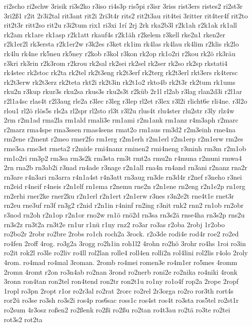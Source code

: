 {ri2scho
ri2schw
3risik
ri3s2ko
r3iso
ri4s3p
ris5pi
r3isr
3riss
rist3ers
ristes2
ri2st3r
3ri2ß1
r2it
2r3i2tal
rit3ant
rit2i
2ri3t4r
rits2
rit2t3au
rit4tei
3ritter
rit4ter4f
rit2to
rit2t3r
ritt2so
rit2u
r3i2tum
rix1
ri3xi
1rí
2rj
2rk
rka2b3l
r2k1ah
r2k1ak
rk1all
rk2am
rk1are
rk1asp
r2k1att
rkauf4s
r2k1äh
r2kelem
r3kell
rke2n1
rken2er
r2k1er2l
rk3ersta
r2k1er2w
r3k2es
r3ket
rk1im
rk4las
rk4lau
rk4lim
r2klis
rk2lo
rk4lu
rk4ne
rk5neu
rk5ney
r2kob
r3kol
r3kon
rk2op
rk1o2ri
r2kou
rk2ö
rk3räu
r3kri
rk3rin
r2k3rom
r2krou
rk2sal
rk2sei
rk2sel
rk2ser
rk2so
rk2sp
rkstati4
rk4stec
rk2stoc
rk2ta
rk2tel
rk2t3eng
rk2t3erf
rk2terg
rk2t3erl
rkt3ers
rk4tersc
rk2t3erw
rk2t3erz
rk2teta
rkt2i
rk2t3in
rk2t1o2
rkto4b
rk2t3r
rk2tum
rk1ums
rku2n
r3kup
rkur3s
rku2sa
rkus3s
rku2s3t
r2küb
2r1l
rl2ab
r3lag
rlan2d3i
r2l1ar
r2l1a4sc
rlas4t
r2l3aug
rle2a
r3lec
r3leg
r3lep
rl2et
r3lex
r3l2i
rlicht6e
rli4ne.
r3l2o
rlou1
rl2ö
rlös5s
rls2a
rl2spr
rl2sto
rl3t
r3l2u
rlus4t
rlu4ster
rlu2str
r3ly
rlz4w
2rm
r2m1ad
rma2la
rm1ald
rmali3e
rm1ami
r2m1ank
rm1anz
r4m3aph
r2marc
r2marz
rma4spe
rma3ssen
rmas4sens
rmat2o
rm1aus
rm3d2
r2m3einh
rme4na
rm2ene
r2ment
r2meo
rmer2fo
rm1erg
r2m1erh
r2m1erl
r2m1erp
r2m1erw
rm2es
rme3sa
rme3st
rmeta2
r2mide
rmi4nanz
rminen2
rmi4neng
r3minh
rm3m
r2m1ob
rm1o2ri
rm3p2
rm3sa
rm3s2k
rm3sta
rm3t
rmt2a
rmu2n
r4muna
r2muni
rmwa4
2rn
rna2b
rn3ab2i
r3nad
rn4ade
r3nage
r2n1all
rna4n
rn4and
rn3ani
r2nanz
rna2r
rn3are
r4n3ari
rn3arra
r4n1a4st
r4n3att
rn3aug
rn3de
rn3d4r
r2nef
r3neho
r3nei
rn2eid
r4neif
r4neis
r2n1elf
rn1ema
r2nemu
rne2n
r2n1ene
rn2eng
r2n1e2p
rn1erg
rn2erhi
rner2ke
rner2ku
r2n1erl
r2n1ert
r2n1erw
r3nes
r3n2e2t
rne4t1e
rnet3r
rn2eu
rne3uf
rn3f
rn3g2
r2nid
r2n1in
r4ninf
rn2ing
r3nit
rnk2
rnn2
rn1ob
rn2obr
r3nod
rn2oh
r2n1op
r2n1or
rno2w
rn1ö
rnö2d
rn3sa
rn3s2ä
rnse4ha
rn3s2p
rns2u
rn3s2z
rn3t2a
rn3t2e
rn1ur
r1nü
r1ny
rnz2
ro3ar
ro3as
r2oba
2robj
1r2obo
ro2bo2r
2robr
ro2bre
2robs
ro1ch
roch2a
3rock.
r2o3de
rodi4e
rod4r
roe2
ro2ed
ro4fen
2roff
4rog.
ro3g2a
3rogg
ro2h1in
roh1l2
4rohn
ro2hö
3rohr
ro4hs
1roi
ro3in
ro2it
rok2l
ro3le
ro2liv
ro4ll
rol2lan
rolle4
roll4en
rolli2n
rol4lini
rol2lis
r4olo
2roly
4rom.
ro4mad
ro4mal
3roman.
2romb
ro4mei
romen3e
ro4m1er
ro5mes
4romm
2romn
4romt
r2on
ro3n4ab
ro2nan
3rond
ro2nerb
roni2e
ro2nika
ro4niki
4ronk
3ronn
ron4tan
ron2tel
ron4tend
ron2tr
ron2t1u
ro1ny
ro1o4f
rop2a
2rope
2ropf
1ropl
ro3pn
2ropt
r1or
ro2r3al
ro2rat
2rorc
ro2rel
2r3orga
ro2ro
ror3th
rort4s
ror2ü
ro3se
ro3sh
ro3s2i
ros4p
ros6sac
ross1c
ros4st
ros4t
ro3sta
ros5tel
ro2st1r
ro2sum
4r3osz
roßen2
ro2ßenk
ro2ßi
ro2ßu
ro2tan
ro4t3au
ro2tä
ro3te
ro2tei
rot3s2
rot2ta
}
